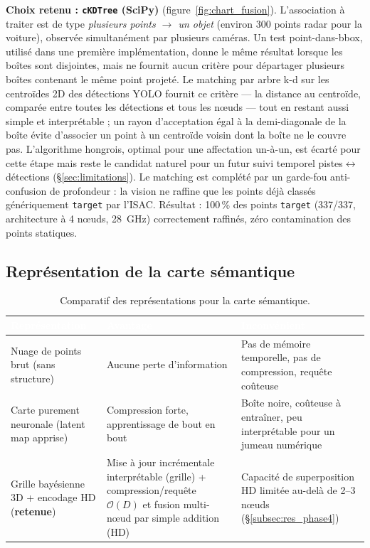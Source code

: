 \documentclass[12pt,a4paper,titlepage]{article}
\newcommand{\hd}[1]{\textcolor{white}{\textbf{#1}}}
\newcommand{\choix}{\rowcolor{tabchoice}}
\begin{document}
\textbf{Choix retenu : \texttt{cKDTree} (SciPy)} (figure~\ref{fig:chart_fusion}). L'association à traiter est de type \textit{plusieurs points $\to$ un objet} (environ 300 points radar pour la voiture), observée simultanément par plusieurs caméras. Un test point-dans-bbox, utilisé dans une première implémentation, donne le même résultat lorsque les boîtes sont disjointes, mais ne fournit aucun critère pour départager plusieurs boîtes contenant le même point projeté. Le matching par arbre k-d sur les centroïdes 2D des détections YOLO fournit ce critère --- la distance au centroïde, comparée entre toutes les détections et tous les n\oe uds --- tout en restant aussi simple et interprétable ; un rayon d'acceptation égal à la demi-diagonale de la boîte évite d'associer un point à un centroïde voisin dont la boîte ne le couvre pas. L'algorithme hongrois, optimal pour une affectation un-à-un, est écarté pour cette étape mais reste le candidat naturel pour un futur suivi temporel pistes$\leftrightarrow$détections (\S\ref{sec:limitations}). Le matching est complété par un garde-fou anti-confusion de profondeur : la vision ne raffine que les points déjà classés génériquement \texttt{target} par l'ISAC. Résultat : 100\,\% des points \texttt{target} (337/337, architecture à 4 n\oe uds, 28~GHz) correctement raffinés, zéro contamination des points statiques.

\subsection{Représentation de la carte sémantique}

\begin{table}[H]
    \centering
    \caption{Comparatif des représentations pour la carte sémantique.}
    \begin{tabularx}{\textwidth}{F{3.8cm}LL}
        \toprule
        \hd{Représentation} & \hd{Avantage} & \hd{Inconvénient} \\
        \midrule
        Nuage de points brut (sans structure) & Aucune perte d'information & Pas de mémoire temporelle, pas de compression, requête coûteuse \\
        Carte purement neuronale (latent map apprise) & Compression forte, apprentissage de bout en bout & Boîte noire, coûteuse à entraîner, peu interprétable pour un jumeau numérique \\
        \choix Grille bayésienne 3D + encodage HD (\textbf{retenue}) & Mise à jour incrémentale interprétable (grille) + compression/requête $\mathcal{O}(D)$ et fusion multi-n\oe ud par simple addition (HD) & Capacité de superposition HD limitée au-delà de 2--3 n\oe uds (\S\ref{subsec:res_phase4}) \\
        \bottomrule
    \end{tabularx}
\end{table}
\end{document}
